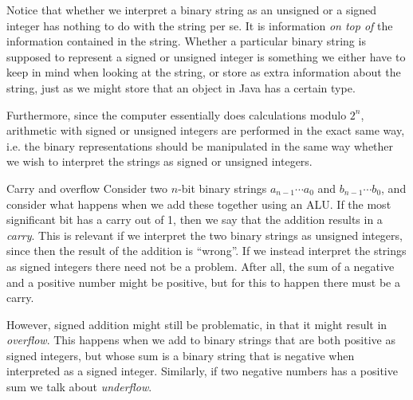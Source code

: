 \documentclass[article, a4paper, 11pt, oneside]{memoir}
\numberwithin{equation}{chapter}
\begin{document}
\begin{notelist}
Notice that whether we interpret a binary string as an unsigned or a signed integer has nothing to do with the string per se. It is information \emph{on top of} the information contained in the string. Whether a particular binary string is supposed to represent a signed or unsigned integer is something we either have to keep in mind when looking at the string, or store as extra information about the string, just as we might store that an object in Java has a certain type.

Furthermore, since the computer essentially does calculations modulo $2^n$, arithmetic with signed or unsigned integers are performed in the exact same way, i.e. the binary representations should be manipulated in the same way whether we wish to interpret the strings as signed or unsigned integers.

\item[Carry and overflow]
Consider two $n$-bit binary strings $a_{n-1} \cdots a_0$ and $b_{n-1} \cdots b_0$, and consider what happens when we add these together using an ALU. If the most significant bit has a carry out of 1, then we say that the addition results in a \emph{carry}. This is relevant if we interpret the two binary strings as unsigned integers, since then the result of the addition is \enquote{wrong}. If we instead interpret the strings as signed integers there need not be a problem. After all, the sum of a negative and a positive number might be positive, but for this to happen there must be a carry.

However, signed addition might still be problematic, in that it might result in \emph{overflow}. This happens when we add to binary strings that are both positive as signed integers, but whose sum is a binary string that is negative when interpreted as a signed integer. Similarly, if two negative numbers has a positive sum we talk about \emph{underflow}.


\end{notelist}
\end{document}

